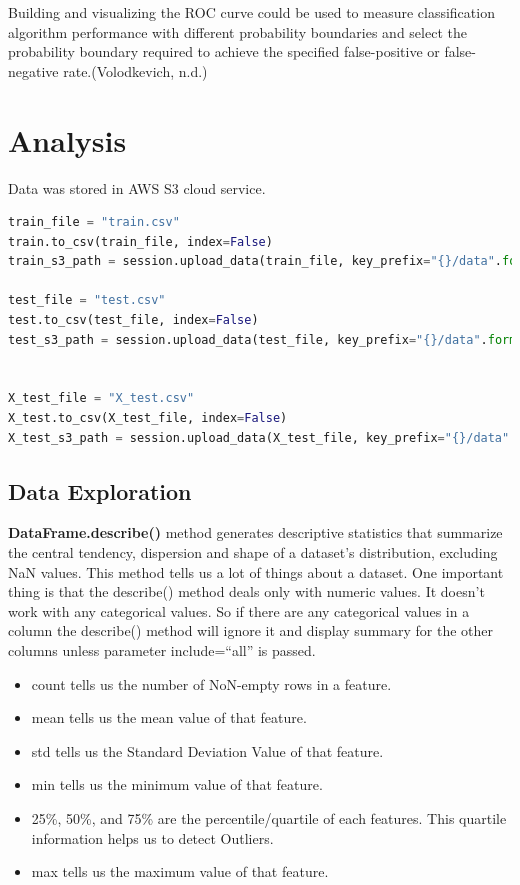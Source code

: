 \documentclass[
]{article}
\providecommand{\tightlist}{%
  \setlength{\itemsep}{0pt}\setlength{\parskip}{0pt}}
\begin{document}
Building and visualizing the ROC curve could be used to measure
classification algorithm performance with different probability
boundaries and select the probability boundary required to achieve the
specified false-positive or false-negative rate.(Volodkevich, n.d.)

\hypertarget{analysis}{%
\section{Analysis}\label{analysis}}

Data was stored in AWS S3 cloud service.

\begin{lstlisting}[language=python]
train_file = "train.csv"
train.to_csv(train_file, index=False)
train_s3_path = session.upload_data(train_file, key_prefix="{}/data".format(prefix))

test_file = "test.csv"
test.to_csv(test_file, index=False)
test_s3_path = session.upload_data(test_file, key_prefix="{}/data".format(prefix))


X_test_file = "X_test.csv"
X_test.to_csv(X_test_file, index=False)
X_test_s3_path = session.upload_data(X_test_file, key_prefix="{}/data".format(prefix))
\end{lstlisting}

\hypertarget{data-exploration}{%
\subsection{Data Exploration}\label{data-exploration}}

\textbf{DataFrame.describe()} method generates descriptive statistics
that summarize the central tendency, dispersion and shape of a dataset's
distribution, excluding NaN values. This method tells us a lot of things
about a dataset. One important thing is that the describe() method deals
only with numeric values. It doesn't work with any categorical values.
So if there are any categorical values in a column the describe() method
will ignore it and display summary for the other columns unless
parameter include=``all'' is passed.

\begin{itemize}
\tightlist
\item
  count tells us the number of NoN-empty rows in a feature.
\item
  mean tells us the mean value of that feature.
\item
  std tells us the Standard Deviation Value of that feature.
\item
  min tells us the minimum value of that feature.
\item
  25\%, 50\%, and 75\% are the percentile/quartile of each features.
  This quartile information helps us to detect Outliers.
\item
  max tells us the maximum value of that feature.
\end{itemize}
\end{document}
